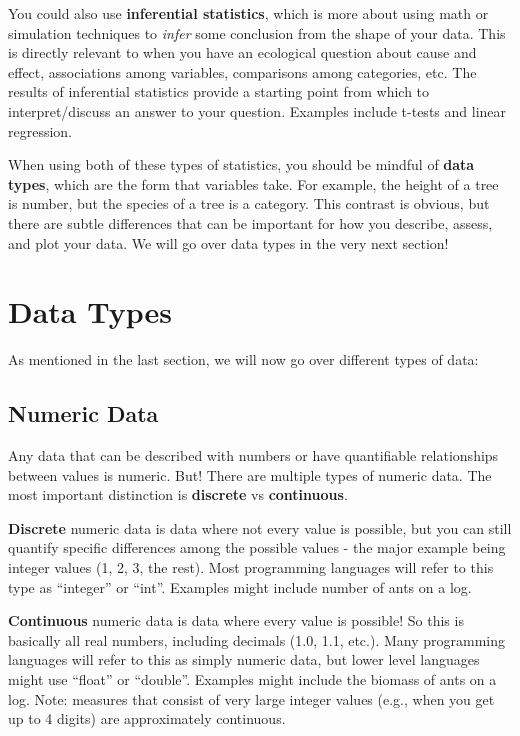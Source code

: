 \documentclass[
  letterpaper,
  DIV=11,
  numbers=noendperiod]{scrreprt}
\begin{document}
You could also use \textbf{inferential statistics}, which is more about
using math or simulation techniques to \emph{infer} some conclusion from
the shape of your data. This is directly relevant to when you have an
ecological question about cause and effect, associations among
variables, comparisons among categories, etc. The results of inferential
statistics provide a starting point from which to interpret/discuss an
answer to your question. Examples include t-tests and linear regression.

When using both of these types of statistics, you should be mindful of
\textbf{data types}, which are the form that variables take. For
example, the height of a tree is number, but the species of a tree is a
category. This contrast is obvious, but there are subtle differences
that can be important for how you describe, assess, and plot your data.
We will go over data types in the very next section!

\chapter{Data Types}\label{data-types}

As mentioned in the last section, we will now go over different types of
data:

\section{Numeric Data}\label{numeric-data}

Any data that can be described with numbers or have quantifiable
relationships between values is numeric. But! There are multiple types
of numeric data. The most important distinction is \textbf{discrete} vs
\textbf{continuous}.

\textbf{Discrete} numeric data is data where not every value is
possible, but you can still quantify specific differences among the
possible values - the major example being integer values (1, 2, 3, the
rest). Most programming languages will refer to this type as ``integer''
or ``int''. Examples might include number of ants on a log.

\textbf{Continuous} numeric data is data where every value is possible!
So this is basically all real numbers, including decimals (1.0, 1.1,
etc.). Many programming languages will refer to this as simply numeric
data, but lower level languages might use ``float'' or ``double''.
Examples might include the biomass of ants on a log. Note: measures that
consist of very large integer values (e.g., when you get up to 4 digits)
are approximately continuous.
\end{document}
